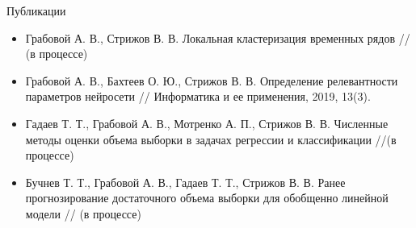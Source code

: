 \documentclass{beamer}
\begin{document}
\begin{frame}{Публикации}
	\begin{itemize}
		\item Грабовой А. В., Стрижов В. В. Локальная кластеризация временных рядов // (в процессе)
		\item Грабовой А. В., Бахтеев О. Ю., Стрижов В. В. Определение релевантности параметров нейросети // Информатика и ее применения, 2019, 13(3).
		\item Гадаев Т. Т., Грабовой А. В., Мотренко А. П., Стрижов В. В. Численные методы оценки объема выборки в задачах регрессии и классификации //(в процессе)
		\item Бучнев Т. Т., Грабовой А. В., Гадаев Т. Т., Стрижов В. В. Ранее прогнозирование достаточного объема выборки для обобщенно линейной модели // (в процессе)
	\end{itemize}
\end{frame}
\end{document}

